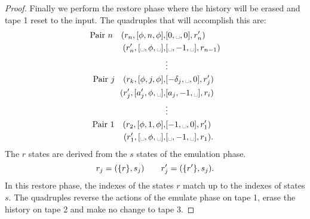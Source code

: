 \begin{proof}
  Finally we perform the restore phase where the history will be erased and tape 1 reset to
  the input. The quadruples that will accomplish this are:
  \begin{align*}
      \text{Pair }n \quad (r_n,[\phi,n,\phi],&[0,\blank,0],r'_n)\\
      (r'_n,[\blank,\phi,\blank],&[\blank,-1,\blank],r_{n-1})\\
      &\vdots\\
      \text{Pair }\jay \quad (r_\kay,[\phi,\jay,\phi],&[-\delta_\jay,\blank,0],r'_\jay)\\
      (r'_\jay,[a'_\jay,\phi,\blank],&[a_\jay,-1,\blank],r_i)\\
      &\vdots\\
      \text{Pair 1} \quad (r_2,[\phi,1,\phi],&[-1,\blank,0],r'_1)\\
      (r'_1,[\blank,\phi,\blank],&[\blank,-1,\blank],r_1).
  \end{align*}
  The $r$ states are derived from the $s$ states of the emulation phase.
  \[
    r_j = (\{r\},s_j) \qquad    r'_j = (\{r'\}, s_j).
  \]
  In this restore phase, the indexes of the states $r$ match up to the indexes of states $s$. The
  quadruples reverse the actions of the emulate phase on tape 1, erase the history on tape 2 and
  make no change to tape 3.

\end{proof}



